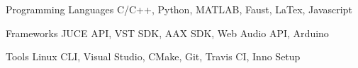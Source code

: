 

\begin{cvskills}

    \cvskill
    {Programming Languages} %
    {C/C++, Python, MATLAB, Faust, LaTex, Javascript} %


    \cvskill
    {Frameworks} %
    {JUCE API, VST SDK, AAX SDK, Web Audio API, Arduino} %

    \cvskill
    {Tools} %
    {Linux CLI, Visual Studio, CMake, Git, Travis CI, Inno Setup} %

\end{cvskills}
